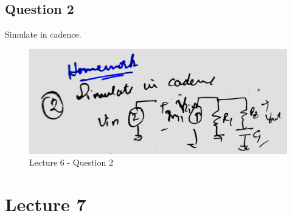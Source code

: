 \documentclass[a4paper]{article}
\begin{document}
\subsection{Question 2}
Simulate in cadence.
\begin{figure}
    \centering
    \includegraphics[width=0.8\linewidth]{images/Lec_6_Q_2.jpeg}
    \caption{Lecture 6 - Question 2}
\end{figure}
\section{Lecture 7}
\end{document}
